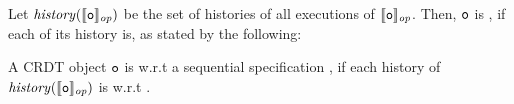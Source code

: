 Let $\mathit{history}(\llbracket \mathtt{o} \rrbracket_{\mathit{op}})$ be the set of histories of all executions of $\llbracket \mathtt{o} \rrbracket_{\mathit{op}}$. Then, $\mathtt{o}$ is \crdtlinearizable{}, if each of its history is, as stated by the following:

\begin{definition}
\label{definition:correctness of a CRDT object}
A CRDT object $\mathtt{o}$ is \crdtlinearizable{} w.r.t a sequential specification \Spec{}, if each history of $\mathit{history}(\llbracket \mathtt{o} \rrbracket_{\mathit{op}})$ is \crdtlinearizable{} w.r.t \Spec{}.
\end{definition}

















